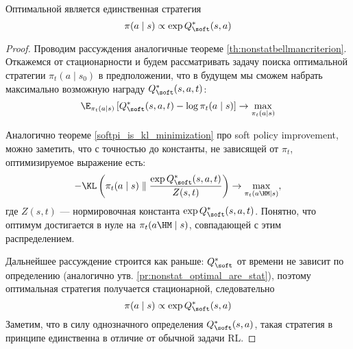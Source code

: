 \begin{theorem}
Оптимальной является единственная стратегия
$$\pi(a \mid s) \propto \exp{Q^*_{\soft}(s, a)}$$
\begin{proof} Проводим рассуждения аналогичные теореме \ref{th:nonstatbellmancriterion}. Откажемся от стационарности и будем рассматривать задачу поиска оптимальной стратегии $\pi_t(a \mid s_0)$ в предположении, что в будущем мы сможем набрать максимально возможную награду $Q^*_{\soft}(s, a, t)$:
$$\E_{\pi_t(a \mid s)} \left[ Q^*_{\soft}(s, a, t) - \log \pi_t(a \mid s) \right] \to \max\limits_{\pi_t(a \mid s)}
$$

Аналогично теореме \ref{softpi_is_kl_minimization} про soft policy improvement, можно заметить, что с точностью до константы, не зависящей от $\pi_t$, оптимизируемое выражение есть:
$$-\KL \left( \pi_t(a \mid s) \parallel \frac{\exp Q^*_{\soft}(s, a, t)}{Z(s, t)} \right) \to \max\limits_{\pi_t(a \HM\mid s)},$$
где $Z(s, t)$ --- нормировочная константа $\exp Q^*_{\soft}(s, a, t)$. Понятно, что оптимум достигается в нуле на $\pi_t(a \HM\mid s)$, совпадающей с этим распределением.

Дальнейшее рассуждение строится как раньше: $Q^*_{\soft}$ от времени не зависит по определению (аналогично утв. \ref{pr:nonstat_optimal_are_stat}), поэтому оптимальная стратегия получается стационарной, следовательно
\begin{equation*}
\pi(a \mid s) \propto \exp Q^*_{\soft}(s, a)
\end{equation*}
Заметим, что в силу однозначного определения $Q^*_{\soft}(s, a)$, такая стратегия в принципе единственна в отличие от обычной задачи RL.
\end{proof}
\end{theorem}


